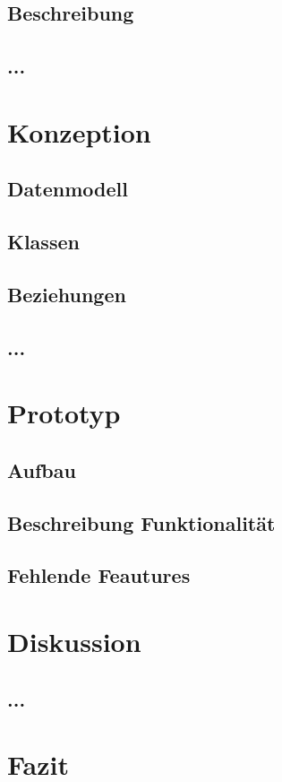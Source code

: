 \documentclass[12pt, titlepage]{article}
\begin{document}
\subsection{Beschreibung }
\subsection{...}

\newpage
\section{Konzeption}
\subsection{Datenmodell}
\subsection{Klassen}
\subsection{Beziehungen}
\subsection{...}

\newpage
\section{Prototyp}
\subsection{Aufbau}
\subsection{Beschreibung Funktionalität}
\subsection{Fehlende Feautures}

\newpage
\section{Diskussion}
\subsection{...}

\newpage
\section{Fazit}
\end{document}
